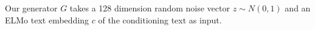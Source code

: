 Our generator $G$ takes a 128 dimension random noise vector $z \sim N(0, 1)$ and an ELMo text embedding $c$ of the conditioning text as input. %